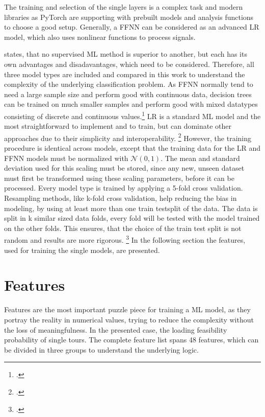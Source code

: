 

The training and selection of the single layers is a complex task
and modern libraries as PyTorch are supporting with prebuilt models and analysis functions to choose
a good setup. Generally, a \gls{FFNN} can be considered as an advanced \gls{LR} model,
which also uses nonlinear functions to process signals.

\parbreak
\cite{kotsiantis_supervised_2007} states, that no supervised \gls{ML} method is superior to another,
but each has its own advantages and disadavantages, which need to be considered.
Therefore, all three model types are included and compared in this work
to understand the complexity of the underlying classification problem. As \gls{FFNN} normally
tend to need a large sample size and perform good with continuous data, decision trees can be
trained on much smaller samples and perform good with mixed datatypes consisting of discrete
and continuous values.\footcite[cf.][pp. 262--264]{kotsiantis_supervised_2007}
\gls{LR} is a standard \gls{ML} model and the most straightforward to implement and to train, but can dominate
other approaches due to their simplicity and interoperability. \footcite[cf.][p. 8]{kirasich_random_2018}
However, the training procedure is identical across models, except that the training data for the \gls{LR} and \gls{FFNN}
models must be normalized with $\mathcal{N}(0,1)$. The mean and standard deviation used
for this scaling must be stored, since any new, unseen dataset must first be transformed
using these scaling parameters, before it can be processed. Every model type is trained by applying a 5-fold cross validation.
Resampling methods, like k-fold cross validation, help reducing the bias in modeling, by using at least more than one train testsplit of the data.
The data is split in k similar sized data folds, every fold will be tested with the model trained on the other folds.
This ensures, that the choice of the train test split is not random and results are more rigorous. \footcite[cf.][pp. 69--72]{kuhn_applied_2016}
In the following section the features, used for training the single models, are presented.


\section{Features}
\label{sec:Features}

Features are the most important puzzle piece for training a \gls{ML} model, as they portray the reality in numerical values, trying to
reduce the complexity without the loss of meaningfulness. In the presented case, the loading feasibility probability of single tours.
The complete feature list spans 48 features, which can be divided in three groups to understand the underlying logic.

